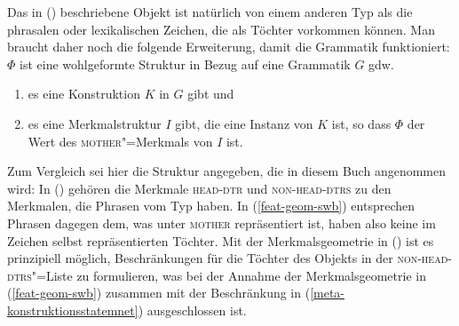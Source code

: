 \z
Das in () beschriebene Objekt ist natürlich von einem anderen Typ
als die phrasalen oder lexikalischen Zeichen, die als Töchter vorkommen können. Man braucht daher
noch die folgende Erweiterung, damit die Grammatik funktioniert:
\ea
\label{meta-konstruktionsstatemnet}
$\Phi$ ist eine wohlgeformte Struktur in Bezug auf eine Grammatik $G$ gdw.\
\begin{enumerate}
\item es eine Konstruktion $K$ in $G$ gibt und
\item es eine Merkmalstruktur $I$ gibt, die eine Instanz von $K$ ist, so dass
      $\Phi$ der Wert des \textsc{mother}"=Merkmals von $I$ ist.
\end{enumerate}
\z
Zum Vergleich sei hier die Struktur angegeben, die in diesem Buch angenommen wird:
\ea
{}
\z
In () gehören die Merkmale \textsc{head-dtr} und \textsc{non-head-dtrs} zu den Merkmalen, die
\zb Phrasen vom Typ \type{head"=argument"=phrase} haben. In (\ref{feat-geom-swb}) entsprechen
Phrasen dagegen dem, was unter \textsc{mother} repräsentiert ist, haben also keine im Zeichen selbst
repräsentierten Töchter. Mit der Merkmalsgeometrie in (\mex{0}) ist es prinzipiell möglich,
Beschränkungen für die Töchter des Objekts in der \textsc{non-head-dtrs}"=Liste zu formulieren, was bei
der Annahme der Merkmalsgeometrie in (\ref{feat-geom-swb}) zusammen mit der Beschränkung in
(\ref{meta-konstruktionsstatemnet}) ausgeschlossen ist. 

